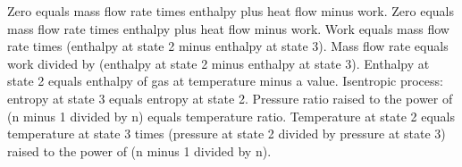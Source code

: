 Zero equals mass flow rate times enthalpy plus heat flow minus work.  
Zero equals mass flow rate times enthalpy plus heat flow minus work.  
Work equals mass flow rate times (enthalpy at state 2 minus enthalpy at state 3).  
Mass flow rate equals work divided by (enthalpy at state 2 minus enthalpy at state 3).  
Enthalpy at state 2 equals enthalpy of gas at temperature minus a value.  
Isentropic process: entropy at state 3 equals entropy at state 2.  
Pressure ratio raised to the power of (n minus 1 divided by n) equals temperature ratio.  
Temperature at state 2 equals temperature at state 3 times (pressure at state 2 divided by pressure at state 3) raised to the power of (n minus 1 divided by n).